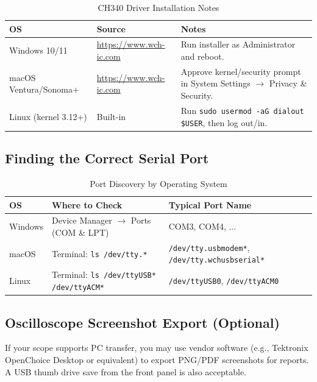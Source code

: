 \documentclass[12pt]{article}
\begin{document}
\begin{table}[h]
\centering
\caption{CH340 Driver Installation Notes}
\begin{tabularx}{\linewidth}{l l X}
\toprule
\textbf{OS} & \textbf{Source} & \textbf{Notes} \\ \midrule
Windows 10/11 & \url{https://www.wch-ic.com} & Run installer as Administrator and reboot. \\
macOS Ventura/Sonoma+ & \url{https://www.wch-ic.com} & Approve kernel/security prompt in System Settings $\rightarrow$ Privacy \& Security. \\
Linux (kernel 3.12+) & Built-in & Run \texttt{sudo usermod -aG dialout \$USER}, then log out/in. \\
\bottomrule
\end{tabularx}
\end{table}

\subsection{Finding the Correct Serial Port}
\begin{table}[h]
\centering
\caption{Port Discovery by Operating System}
\begin{tabularx}{\linewidth}{l X X}
\toprule
\textbf{OS} & \textbf{Where to Check} & \textbf{Typical Port Name} \\ \midrule
Windows & Device Manager $\rightarrow$ Ports (COM \& LPT) & COM3, COM4, ... \\
macOS & Terminal: \texttt{ls /dev/tty.*} & \texttt{/dev/tty.usbmodem*}, \texttt{/dev/tty.wchusbserial*} \\
Linux & Terminal: \texttt{ls /dev/ttyUSB* /dev/ttyACM*} & \texttt{/dev/ttyUSB0}, \texttt{/dev/ttyACM0} \\
\bottomrule
\end{tabularx}
\end{table}

\subsection{Oscilloscope Screenshot Export (Optional)}
If your scope supports PC transfer, you may use vendor software (e.g., Tektronix OpenChoice Desktop or equivalent) to export PNG/PDF screenshots for reports. A USB thumb drive save from the front panel is also acceptable.
\end{document}
